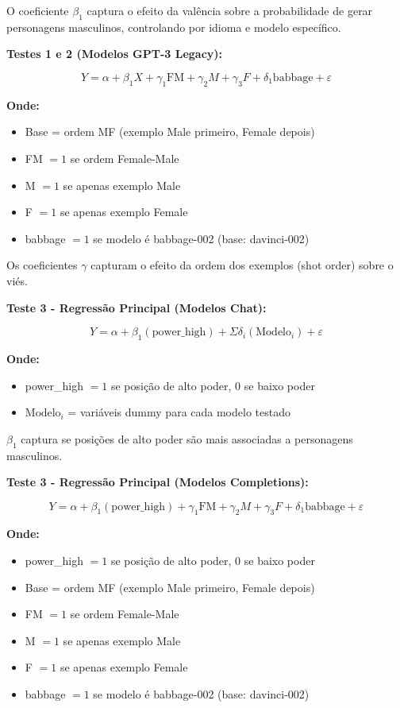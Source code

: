 \documentclass[12pt,a4paper]{article}
\begin{document}
O coeficiente $\beta_1$ captura o efeito da valência sobre a probabilidade de
gerar personagens masculinos, controlando por idioma e modelo
específico.

\textbf{Testes 1 e 2 (Modelos GPT-3 Legacy):}

\begin{equation}
Y = \alpha + \beta_1 X + \gamma_1 \text{FM} + \gamma_2 M + \gamma_3 F + \delta_1 \text{babbage} + \varepsilon
\end{equation}

\textbf{Onde:}
\begin{itemize}
\item Base = ordem MF (exemplo Male primeiro, Female depois)
\item FM $= 1$ se ordem Female-Male
\item M $= 1$ se apenas exemplo Male
\item F $= 1$ se apenas exemplo Female
\item babbage $= 1$ se modelo é babbage-002 (base: davinci-002)
\end{itemize}

Os coeficientes $\gamma$ capturam o efeito da ordem dos exemplos (shot order)
sobre o viés.

\textbf{Teste 3 - Regressão Principal (Modelos Chat):}

\begin{equation}
Y = \alpha + \beta_1(\text{power\_high}) + \Sigma\delta_i(\text{Modelo}_i) + \varepsilon
\end{equation}

\textbf{Onde:}
\begin{itemize}
\item power\_high $= 1$ se posição de alto poder, 0 se baixo poder
\item $\text{Modelo}_i$ = variáveis dummy para cada modelo testado
\end{itemize}

$\beta_1$ captura se posições de alto poder são mais associadas a personagens
masculinos.

\textbf{Teste 3 - Regressão Principal (Modelos Completions):}

\begin{equation}
Y = \alpha + \beta_1(\text{power\_high}) + \gamma_1 \text{FM} + \gamma_2 M + \gamma_3 F + \delta_1 \text{babbage} + \varepsilon
\end{equation}

\textbf{Onde:}
\begin{itemize}
\item power\_high $= 1$ se posição de alto poder, 0 se baixo poder
\item Base = ordem MF (exemplo Male primeiro, Female depois)
\item FM $= 1$ se ordem Female-Male
\item M $= 1$ se apenas exemplo Male
\item F $= 1$ se apenas exemplo Female
\item babbage $= 1$ se modelo é babbage-002 (base: davinci-002)
\end{itemize}
\end{document}
